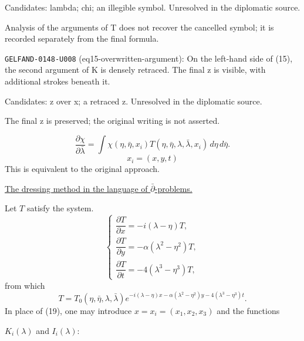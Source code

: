 Candidates: lambda; chi; an illegible symbol. Unresolved in the diplomatic source.\par
Analysis of the arguments of T does not recover the cancelled symbol; it is recorded separately from the final formula.\par
\noindent\texttt{GELFAND-0148-U008} (eq15-overwritten-argument): On the left-hand side of (15), the second argument of K is densely retraced. The final z is visible, with additional strokes beneath it.\par
Candidates: z over x; a retraced z. Unresolved in the diplomatic source.\par
The final z is preserved; the original writing is not asserted.\par


\begin{equation*}
\frac{\partial\chi}{\partial\bar\lambda}
=\int\chi(\eta,\bar\eta,x_i)T(\eta,\bar\eta,\lambda,\bar\lambda,x_i)\,d\eta\,d\bar\eta. \tag{18}
\end{equation*}
\begin{equation*}
x_i=(x,y,t)
\end{equation*}
This is equivalent to the original approach.

\underline{The dressing method in the language of $\bar\partial$-problems.}

Let $T$ satisfy the system.
\begin{equation*}
\begin{cases}
\dfrac{\partial T}{\partial x}=-i(\lambda-\eta)T,\\[5pt]
\dfrac{\partial T}{\partial y}=-\alpha(\lambda^2-\eta^2)T,\\[5pt]
\dfrac{\partial T}{\partial t}=-4(\lambda^3-\eta^3)T,
\end{cases} \tag{19}
\end{equation*}
from which
\begin{equation*}
T=T_0(\eta,\bar\eta,\lambda,\bar\lambda)
 e^{-i(\lambda-\eta)x-\alpha(\lambda^2-\eta^2)y-4(\lambda^3-\eta^3)t}. \tag{20}
\end{equation*}
In place of (19), one may introduce $x=x_i=(x_1,x_2,x_3)$ and the functions

$K_i(\lambda)$ and $I_i(\lambda)$:

